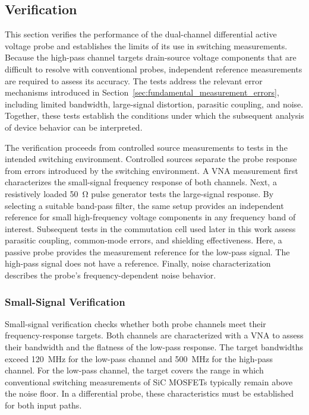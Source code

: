 
\subsection{Verification}
This section verifies the performance of the dual-channel differential active voltage probe and establishes the limits of its use in switching measurements.
Because the high-pass channel targets drain-source voltage components that are difficult to resolve with conventional probes, independent reference measurements are required to assess its accuracy.
The tests address the relevant error mechanisms introduced in Section~\ref{sec:fundamental_measurement_errors}, including limited bandwidth, large-signal distortion, parasitic coupling, and noise.
Together, these tests establish the conditions under which the subsequent analysis of device behavior can be interpreted.

The verification proceeds from controlled source measurements to tests in the intended switching environment.
Controlled sources separate the probe response from errors introduced by the switching environment.
A VNA measurement first characterizes the small-signal frequency response of both channels.
Next, a resistively loaded \SI{50}{\ohm} pulse generator tests the large-signal response.
By selecting a suitable band-pass filter, the same setup provides an independent reference for small high-frequency voltage components in any frequency band of interest.
Subsequent tests in the commutation cell used later in this work assess parasitic coupling, common-mode errors, and shielding effectiveness.
Here, a passive probe provides the measurement reference for the low-pass signal.
The high-pass signal does not have a reference.
Finally, noise characterization describes the probe's frequency-dependent noise behavior.









\subsubsection*{Small-Signal Verification}
Small-signal verification checks whether both probe channels meet their frequency-response targets.
Both channels are characterized with a VNA to assess their bandwidth and the flatness of the low-pass response.
The target bandwidths exceed \SI{120}{MHz} for the low-pass channel and \SI{500}{MHz} for the high-pass channel.
For the low-pass channel, the target covers the range in which conventional switching measurements of SiC MOSFETs typically remain above the noise floor.
In a differential probe, these characteristics must be established for both input paths.

